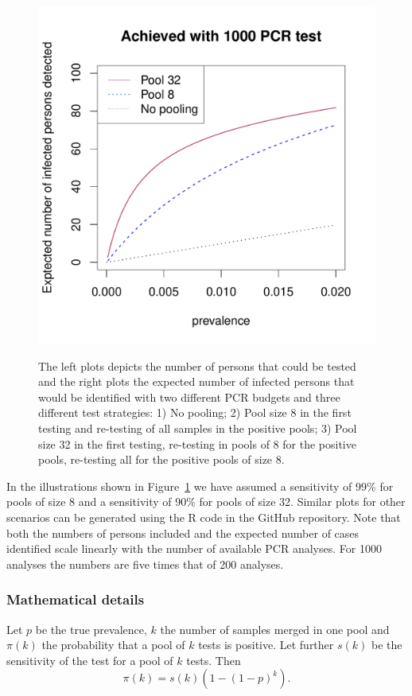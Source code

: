 \documentclass[10pt]{article}
\begin{document}
\begin{figure}[!hbt]
\begin{center}
\includegraphics[width=0.48\linewidth]{ndetected1000.pdf}\\
\end{center}
\caption{The left plots depicts the number of persons that could be tested and the right plots the expected number of infected persons that would be identified with two different PCR budgets and three different test strategies: 1) No pooling; 2) Pool size 8 in the first testing and re-testing of all samples in the positive pools; 3) Pool size 32 in the first testing, re-testing in pools of 8 for the positive pools, re-testing all for the positive pools of size 8.}
\label{S2}
\end{figure}


In the illustrations shown in Figure~\ref{S2}  we have assumed a sensitivity of 99\% for pools of size 8 and a sensitivity of 90\% for pools of size 32.  Similar plots for other scenarios can be generated using the R code in the GitHub repository. Note that both the numbers of persons included and the expected number of cases identified scale linearly with the number of available PCR analyses. For 1000 analyses the numbers are five times that of 200 analyses.

\subsubsection*{Mathematical details}

Let $p$ be the true prevalence, $k$ the number of samples merged in one pool and $\pi(k)$ the probability that a pool of $k$ tests is positive. Let further $s(k)$ be the sensitivity of the test for a pool of  $k$ tests. Then
\begin{equation}
\label{pip}
\pi(k)=s(k)(1-(1-p)^k).
\end{equation}
\end{document}

